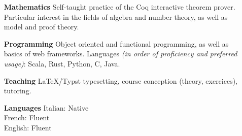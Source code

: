 \documentclass[11pt]{article}
\begin{document}
  \begin{adjustwidth}{1in}{}
    \begin{itemize}
      \item[\textbf{Mathematics}] Self-taught practice of the Coq interactive theorem prover. Particular interest in the fields of algebra and number theory, as well as model and proof theory. 
      \item[\textbf{Programming}] Object oriented and functional programming, as well as basics of web frameworks. Languages \textit{(in order of proficiency and preferred usage)}: Scala, Rust, Python, C, Java. 
      \item[\textbf{Teaching}] LaTeX/Typst typesetting, course conception (theory, exercices), tutoring.
      \item[\textbf{Languages}] Italian: Native \\ French: Fluent \\ English: Fluent
    \end{itemize}
  \end{adjustwidth}
\end{document}
